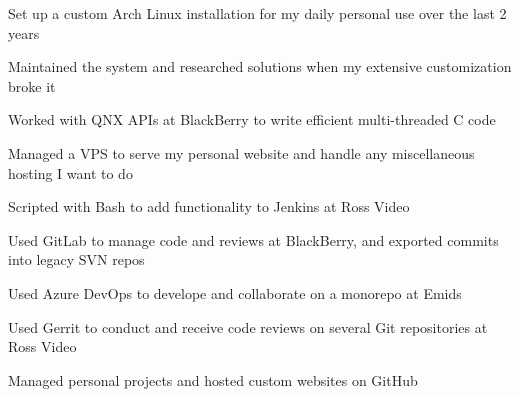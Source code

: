 
\begin{bullets}
    \item Set up a custom Arch Linux installation for my daily personal use over the last 2 years
    \item Maintained the system and researched solutions when my extensive customization broke it
    \item Worked with QNX APIs at BlackBerry to write efficient multi-threaded C code
    \item Managed a VPS to serve my personal website and handle any miscellaneous hosting I want to do
    \item Scripted with Bash to add functionality to Jenkins at Ross Video
\end{bullets}

\begin{bullets}
	\item Used GitLab to manage code and reviews at BlackBerry, and exported commits into legacy SVN repos
    \item Used Azure DevOps to develope and collaborate on a monorepo at Emids
    \item Used Gerrit to conduct and receive code reviews on several Git repositories at Ross Video
    \item Managed personal projects and hosted custom websites on GitHub
\end{bullets}
